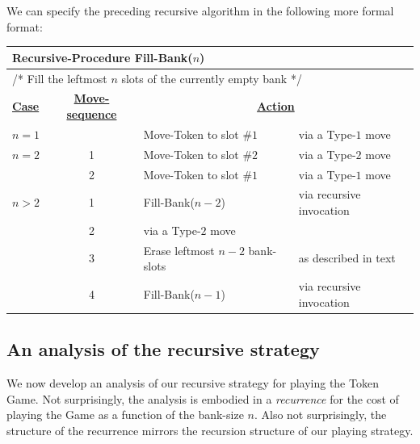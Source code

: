 
\medskip

We can specify the preceding recursive algorithm in the following more
formal format:

\medskip

\begin{tabular}{|l|c|ll|}
\multicolumn{4}{l}{{\bf Recursive-Procedure} Fill-Bank($n$)} \\
\hline
\multicolumn{4}{l}{/* Fill the leftmost $n$ slots of the currently
  empty bank */} \\
\hline
\hline
\underline{\bf Case} & \underline{\bf Move-sequence} & 
\multicolumn{2}{c}{\underline{\bf Action}} \\ 
$n=1$ &   & Move-Token to slot \#$1$ & via a Type-$1$ move \\
\hline
$n=2$ & 1 & Move-Token to slot \#$2$ & via a Type-$2$ move \\
      & 2 & Move-Token to slot \#$1$ & via a Type-$1$ move \\
\hline
$n>2$ & 1 & Fill-Bank($n-2$) & via recursive invocation \\
      & 2 & via a Type-$2$ move \\
      & 3 & Erase leftmost $n-2$ bank-slots & as described in text \\
      & 4 & Fill-Bank($n-1$) & via recursive invocation \\
\hline
\end{tabular}

\subsection{An analysis of the recursive strategy}
\label{sec:analysis-of-Token-Game}

We now develop an analysis of our recursive strategy for playing the
Token Game.  Not surprisingly, the analysis is embodied in a {\it
  recurrence} for the cost of playing the Game as a function of the
bank-size $n$.  Also not surprisingly, the structure of the recurrence
mirrors the recursion structure of our playing strategy.

